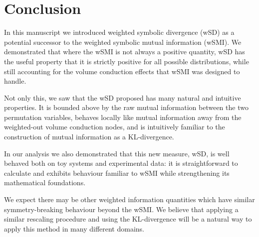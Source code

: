 \documentclass[twocolumns]{IEEEtran}%
\theoremstyle{definition}
\begin{document}
\section{Conclusion}

In this manuscript we introduced weighted symbolic divergence (wSD) as a potential successor to the weighted symbolic mutual information (wSMI). We demonstrated that where the wSMI is not always a positive quantity, wSD has the useful property that it is strictly positive for all possible distributions, while still accounting for the volume conduction effects that wSMI was designed to handle.

Not only this, we saw that the wSD proposed has many natural and intuitive properties. It is bounded above by the raw mutual information between the two permutation variables, behaves locally like mutual information away from the weighted-out volume conduction nodes, and is intuitively familiar to the construction of mutual information as a KL-divergence.

In our analysis we also demonstrated that this new measure, wSD, is well behaved both on toy systems and experimental data: it is straightforward to calculate and exhibits behaviour familiar to wSMI while strengthening its mathematical foundations.

We expect there may be other weighted information quantities which have similar symmetry-breaking behaviour beyond the wSMI. We believe that applying a similar rescaling procedure and using the KL-divergence will be a natural way to apply this method in many different domains.



\end{document}
